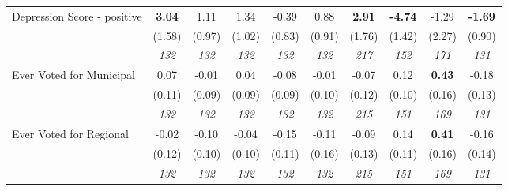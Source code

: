 \begin{tabular}{l c c c c c c c c c}
Depression Score - positive & \textbf{ 3.04 } & 1.11 & 1.34 & -0.39 & 0.88 & \textbf{ 2.91 } & \textbf{-4.74} & -1.29 & \textbf{-1.69} \\
& (1.58) & (0.97) & (1.02) & (0.83) & (0.91) & (1.76) & (1.42) & (2.27) & (0.90) \\
& \textit{ 132 } & \textit{ 132 } & \textit{ 132 } & \textit{ 132 } & \textit{ 132 } & \textit{ 217 } & \textit{ 152 } & \textit{ 171 } & \textit{ 131 } \\
Ever Voted for Municipal & 0.07 & -0.01 & 0.04 & -0.08 & -0.01 & -0.07 & 0.12 & \textbf{ 0.43 } & -0.18 \\
& (0.11) & (0.09) & (0.09) & (0.09) & (0.10) & (0.12) & (0.10) & (0.16) & (0.13) \\
& \textit{ 132 } & \textit{ 132 } & \textit{ 132 } & \textit{ 132 } & \textit{ 132 } & \textit{ 215 } & \textit{ 151 } & \textit{ 169 } & \textit{ 131 } \\
Ever Voted for Regional & -0.02 & -0.10 & -0.04 & -0.15 & -0.11 & -0.09 & 0.14 & \textbf{ 0.41 } & -0.16 \\
& (0.12) & (0.10) & (0.10) & (0.11) & (0.16) & (0.13) & (0.11) & (0.16) & (0.14) \\
& \textit{ 132 } & \textit{ 132 } & \textit{ 132 } & \textit{ 132 } & \textit{ 132 } & \textit{ 215 } & \textit{ 151 } & \textit{ 169 } & \textit{ 131 } \\
\bottomrule
\end{tabular}
